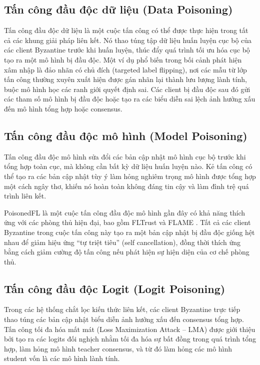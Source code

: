 \subsection{Tấn công đầu độc dữ liệu (Data Poisoning)}
Tấn công đầu độc dữ liệu là một cuộc tấn công có thể được thực hiện trong tất cả các khung giải pháp liên kết. Nó thao túng tập dữ liệu huấn luyện cục bộ của các client Byzantine trước khi huấn luyện, thúc đẩy quá trình tối ưu hóa cục bộ tạo ra một mô hình bị đầu độc. Một ví dụ phổ biến trong bối cảnh phát hiện xâm nhập là đảo nhãn có chủ đích (targeted label flipping), nơi các mẫu từ lớp tấn công thường xuyên xuất hiện được gán nhãn lại thành lưu lượng lành tính, buộc mô hình học các ranh giới quyết định sai. Các client bị đầu độc sau đó gửi các tham số mô hình bị đầu độc hoặc tạo ra các biểu diễn sai lệch ảnh hưởng xấu đến mô hình tổng hợp hoặc consensus.

\subsection{Tấn công đầu độc mô hình (Model Poisoning)}
Tấn công đầu độc mô hình sửa đổi các bản cập nhật mô hình cục bộ trước khi tổng hợp toàn cục, mà không cần bất kỳ dữ liệu huấn luyện nào. Kẻ tấn công có thể tạo ra các bản cập nhật tùy ý làm hỏng nghiêm trọng mô hình được tổng hợp một cách ngây thơ, khiến nó hoàn toàn không đáng tin cậy và làm đình trệ quá trình liên kết.

PoisonedFL \cite{xie2025poisonedfl} là một cuộc tấn công đầu độc mô hình gần đây có khả năng thích ứng với các phòng thủ hiện đại, bao gồm FLTrust \cite{cao2020fltrust} và FLAME \cite{nguyen2022flame}. Tất cả các client Byzantine trong cuộc tấn công này tạo ra một bản cập nhật bị đầu độc giống hệt nhau để giảm hiệu ứng ``tự triệt tiêu'' (self cancellation), đồng thời thích ứng bằng cách giảm cường độ tấn công nếu phát hiện sự hiện diện của cơ chế phòng thủ.

\subsection{Tấn công đầu độc Logit (Logit Poisoning)}
Trong các hệ thống chắt lọc kiến thức liên kết, các client Byzantine trực tiếp thao túng các bản cập nhật biểu diễn ảnh hưởng xấu đến consensus tổng hợp. Tấn công tối đa hóa mất mát (Loss Maximization Attack -- LMA) được giới thiệu bởi \cite{roux2025byzantine} tạo ra các logits đối nghịch nhằm tối đa hóa sự bất đồng trong quá trình tổng hợp, làm hỏng mô hình teacher consensus, và từ đó làm hỏng các mô hình student vốn là các mô hình lành tính.

